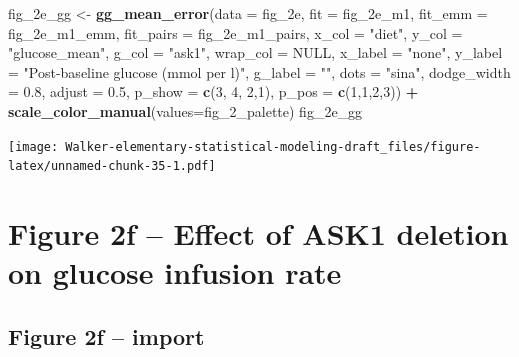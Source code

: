 \documentclass[]{book}
\newenvironment{Shaded}{\begin{snugshade}}{\end{snugshade}}
\newcommand{\DataTypeTok}[1]{\textcolor[rgb]{0.13,0.29,0.53}{#1}}
\newcommand{\DecValTok}[1]{\textcolor[rgb]{0.00,0.00,0.81}{#1}}
\newcommand{\FloatTok}[1]{\textcolor[rgb]{0.00,0.00,0.81}{#1}}
\newcommand{\KeywordTok}[1]{\textcolor[rgb]{0.13,0.29,0.53}{\textbf{#1}}}
\newcommand{\NormalTok}[1]{#1}
\newcommand{\OperatorTok}[1]{\textcolor[rgb]{0.81,0.36,0.00}{\textbf{#1}}}
\newcommand{\OtherTok}[1]{\textcolor[rgb]{0.56,0.35,0.01}{#1}}
\newcommand{\StringTok}[1]{\textcolor[rgb]{0.31,0.60,0.02}{#1}}
\begin{document}
\begin{Shaded}
\begin{Highlighting}[]
\NormalTok{fig_2e_gg <-}\StringTok{ }\KeywordTok{gg_mean_error}\NormalTok{(}\DataTypeTok{data =}\NormalTok{ fig_2e,}
                          \DataTypeTok{fit =}\NormalTok{ fig_2e_m1,}
                          \DataTypeTok{fit_emm =}\NormalTok{ fig_2e_m1_emm,}
                          \DataTypeTok{fit_pairs =}\NormalTok{ fig_2e_m1_pairs,}
                          \DataTypeTok{x_col =} \StringTok{"diet"}\NormalTok{,}
                          \DataTypeTok{y_col =} \StringTok{"glucose_mean"}\NormalTok{,}
                          \DataTypeTok{g_col =} \StringTok{"ask1"}\NormalTok{,}
                          \DataTypeTok{wrap_col =} \OtherTok{NULL}\NormalTok{,}
                          \DataTypeTok{x_label =} \StringTok{"none"}\NormalTok{,}
                          \DataTypeTok{y_label =} \StringTok{"Post-baseline glucose (mmol per l)"}\NormalTok{,}
                          \DataTypeTok{g_label =} \StringTok{""}\NormalTok{,}
                          \DataTypeTok{dots =} \StringTok{"sina"}\NormalTok{,}
                          \DataTypeTok{dodge_width =} \FloatTok{0.8}\NormalTok{,}
                          \DataTypeTok{adjust =} \FloatTok{0.5}\NormalTok{,}
                          \DataTypeTok{p_show =} \KeywordTok{c}\NormalTok{(}\DecValTok{3}\NormalTok{, }\DecValTok{4}\NormalTok{, }\DecValTok{2}\NormalTok{,}\DecValTok{1}\NormalTok{),}
                          \DataTypeTok{p_pos =} \KeywordTok{c}\NormalTok{(}\DecValTok{1}\NormalTok{,}\DecValTok{1}\NormalTok{,}\DecValTok{2}\NormalTok{,}\DecValTok{3}\NormalTok{)) }\OperatorTok{+}
\StringTok{  }\KeywordTok{scale_color_manual}\NormalTok{(}\DataTypeTok{values=}\NormalTok{fig_}\DecValTok{2}\NormalTok{_palette)}
\NormalTok{fig_2e_gg}
\end{Highlighting}
\end{Shaded}

\texttt{[image: Walker-elementary-statistical-modeling-draft\_files/figure-latex/unnamed-chunk-35-1.pdf]}

\hypertarget{figure-2f-effect-of-ask1-deletion-on-glucose-infusion-rate}{%
\section{Figure 2f -- Effect of ASK1 deletion on glucose infusion rate}\label{figure-2f-effect-of-ask1-deletion-on-glucose-infusion-rate}}

\hypertarget{figure-2f-import}{%
\subsection{Figure 2f -- import}\label{figure-2f-import}}
\end{document}
